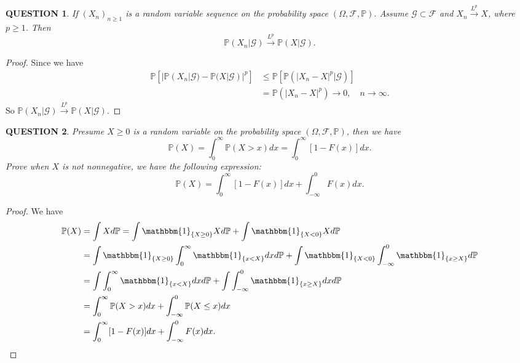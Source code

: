 \documentclass[12pt]{article}
\renewcommand{\(}{\left(}%
\renewcommand{\)}{\right)}%
\renewcommand{\[}{\left[}%
\renewcommand{\]}{\right]}%
\newcommand{\p}{\mathbb{P}}
\newcommand{\f}{\mathscr{F}}
\newcommand{\g}{\mathscr{G}}
\newtheorem{question}{QUESTION}[section]}
\newtheorem{proof}{Proof.}}
\begin{document}
  \begin{question}
    If $(X_n)_{n\geq 1}$ is a random variable sequence on the probability space $(\Omega,\f,\p )$. Assume $\g\subset\f$ and $X_n\overset{L^p}{\to} X$, where $p\geq 1$. Then
    \begin{equation*}
      \p(X_n|\g)\overset{L^p}{\to} \p(X|\g).
    \end{equation*}
  \end{question}
  \begin{proof}
    Since we have 
    \begin{equation*}
      \begin{split}
         \p[|\p(X_n|\g)- \p(X|\g)|^p] & \leq \p[\p(|X_n-X|^p|\g)] \\
           & =\p(|X_n-X|^p)\to 0,\quad n\to\infty.
      \end{split}
    \end{equation*}
    So $\p(X_n|\g)\overset{L^p}{\to} \p(X|\g).$
  \end{proof}
  
  \begin{question}
  	Presume $X\geq 0$ is a random variable on the probability space $(\Omega,\f,\p)$, then we have 
  	\begin{equation*}
  		\p(X)=\int_0^\infty \p(X> x)dx=\int_0^\infty [1-F(x)]dx.
  	\end{equation*}
  	Prove when $X$ is not nonnegative, we have the following expression:
  	\begin{equation*}
  		\p(X)=\int_0^\infty [1-F(x)]dx+\int_{-\infty}^0 F(x)dx.
  	\end{equation*}
  \end{question}
  \begin{proof}
  	We have
  	\begin{equation*}
  		\begin{split}
  			\p(X)&=\int Xd\p=\int \mathbbm{1}_{\{X\geq 0\}}Xd\p+\int \mathbbm{1}_{\{X< 0\}}Xd\p\\
  			&=\int \mathbbm{1}_{\{X\geq 0\}}\int_0^\infty \mathbbm{1}_{\{x<X\}}dx d\p+\int \mathbbm{1}_{\{X< 0\}}\int_{-\infty}^0\mathbbm{1}_{\{x\geq X\}} d\p\\
  			&=\int \int_0^\infty \mathbbm{1}_{\{x<X\}}dx d\p+\int \int_{-\infty}^0\mathbbm{1}_{\{x\geq X\}} dxd\p\\
  			&=\int_0^\infty \p(X>x)dx+\int_{-\infty}^0 \p(X\leq x)dx\\
  			&=\int_0^\infty [1-F(x)]dx+\int_{-\infty}^0 F(x)dx.
  		\end{split}
  	\end{equation*}
  \end{proof}
  
\end{document}
